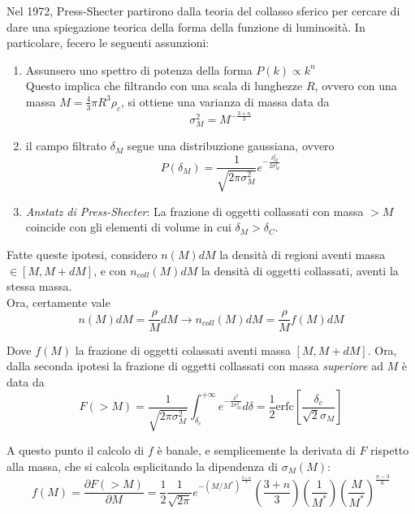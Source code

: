\documentclass{report}
\begin{document}
Nel 1972, Press-Shecter partirono dalla teoria del collasso sferico per cercare di dare una spiegazione teorica della forma della funzione di luminosità. In particolare, fecero le seguenti assunzioni: 
\begin{enumerate}
    \item Assunsero uno spettro di potenza della forma $P(k)\propto k^n$ \\
    Questo implica che filtrando con una scala di lunghezze $R$, ovvero con una massa $M = \frac{4}{3}\pi R^3 \rho_c$, si ottiene una varianza di massa data da 
    \begin{equation}
        \sigma^2_M = M^{-\frac{3+n}{3}}
    \end{equation}
    \item il campo filtrato $\delta_M$ segue una distribuzione gaussiana, ovvero 
    \begin{equation}
        P(\delta_M) = \frac{1}{\sqrt{2\pi \sigma^2_M}}e^{-\frac{\delta_M^2}{2\sigma^2_M}}
    \end{equation}
    \item \emph{Anstatz di Press-Shecter}: La frazione di oggetti collassati con massa $> M$ coincide con gli elementi di volume in cui $\delta_M > \delta_C$. 
\end{enumerate}

Fatte queste ipotesi, considero $n(M)dM$ la densità di regioni aventi massa $\in [M, M+dM]$, e con $n_{coll}(M)dM$ la densità di oggetti collassati, aventi la stessa massa. \\

Ora, certamente vale
\begin{equation}
    n(M)dM = \frac{\rho}{M}dM \rightarrow n_{coll}(M)dM = \frac{\rho}{M}f(M)dM
\end{equation}

Dove $f(M)$ la frazione di oggetti colassati aventi massa $[M, M+dM]$. Ora, dalla seconda ipotesi la frazione di oggetti collassati con massa \emph{superiore} ad $M$ è data da 
\begin{equation}
    F(>M) = \frac{1}{\sqrt{2\pi \sigma^2_M}}\int_{\delta_c}^{+\infty} e^{-\frac{\delta^2}{2\sigma^2_M}}d\delta = \frac{1}{2}\text{erfc}\left[\frac{\delta_c}{\sqrt{2}\sigma_M}\right]
\end{equation}

A questo punto il calcolo di $f$ è banale, e semplicemente la derivata di $F$ rispetto alla massa, che si calcola esplicitando la dipendenza di $\sigma_M(M)$: 
\begin{equation}
    f(M) = \frac{\partial F(>M)}{\partial M} = \frac{1}{2}\frac{1}{\sqrt{2\pi}}e^{-(M/M^*)^{\frac{3+n}{3}}}\left(\frac{3+n}{3} \right)\left(\frac{1}{M^*} \right)
\left(\frac{M}{M^*} \right)^{\frac{n-3}{6}}
\end{equation}
\end{document}
